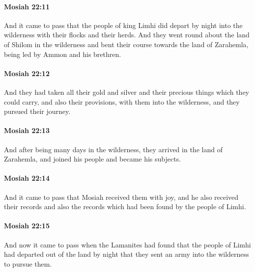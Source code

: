 		\paragraph{Mosiah 22:11} %
			\label{MOSIAH-22-11}

			And it came to pass that the people of king Limhi did depart by night
			into the wilderness with their flocks and their herds.
			And they went round about the land of Shilom in the wilderness
			and bent their course towards the land of Zarahemla,
			being led by Ammon and his brethren.

		\paragraph{Mosiah 22:12} %
			\label{MOSIAH-22-12}

			And they had taken all their gold and silver
			and their precious things which they could carry,
			and also their provisions,
			with them into the wilderness,
			and they pursued their journey.

		\paragraph{Mosiah 22:13} %
			\label{MOSIAH-22-13}

			And after being many days in the wilderness,
			they arrived in the land of Zarahemla,
			and joined his people and became his subjects.

		\paragraph{Mosiah 22:14} %
			\label{MOSIAH-22-14}

			And it came to pass that Mosiah received them with joy,
			and he also received their records and also the records
			which had been found by the people of Limhi.

		\paragraph{Mosiah 22:15} %
			\label{MOSIAH-22-15}

			And now it came to pass when the Lamanites had found
			that the people of Limhi had departed out of the land by night
			that they sent an army into the wilderness to pursue them.

